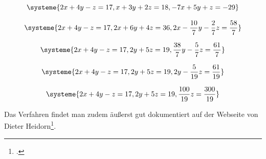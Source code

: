 \[ %
\systeme{
	2x  +  4y  -   z  =  17,
	 x  +  3y  +  2z  =  18,
	-7x +  5y  +   z  = -29}
\]

\[ %
\systeme{
	2x  +  4y  -   z  =  17,
	2x  +  6y  +  4z  =  36,
	2x - \frac{10}{7}y - \frac{2}{7}z = \frac{58}{7}}
\]

\[ %
\systeme{
	2x  +  4y  -   z  =  17,
	       2y  +  5z  =  19,
		   \frac{38}{7}y  -  \frac{5}{7}z  = \frac{61}{7}}
\]

\[ %
\systeme{
	2x  +  4y  -   z  =  17,
		   2y  +  5z  =  19,
		   2y  -  \frac{5}{19}z  = \frac{61}{19}}
\]

\[ %
\systeme{
	2x  +  4y  -   z  =  17,
		2y  +  5z  =  19,
			\frac{100}{19}z  = \frac{300}{19}}
\]


Das Verfahren findet man zudem äußerst gut dokumentiert auf der Webseite von Dieter Heidorn\footcite{math_gauss_verfahren}. %